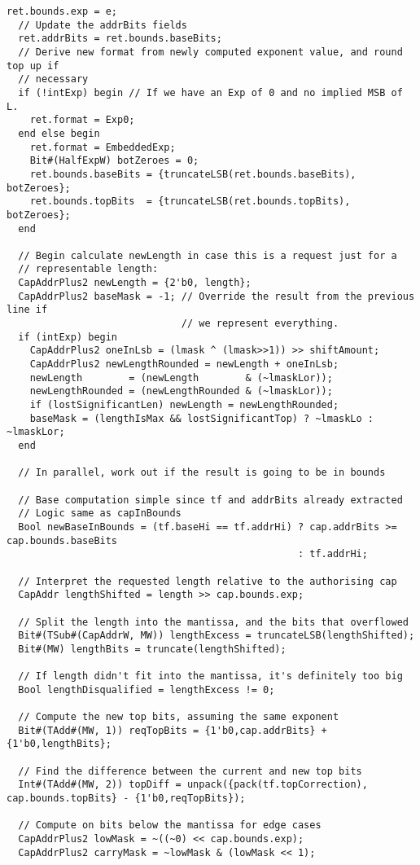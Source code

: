 \begin{lstlisting}[language=bluespec]
  ret.bounds.exp = e;
  // Update the addrBits fields
  ret.addrBits = ret.bounds.baseBits;
  // Derive new format from newly computed exponent value, and round top up if
  // necessary
  if (!intExp) begin // If we have an Exp of 0 and no implied MSB of L.
    ret.format = Exp0;
  end else begin
    ret.format = EmbeddedExp;
    Bit#(HalfExpW) botZeroes = 0;
    ret.bounds.baseBits = {truncateLSB(ret.bounds.baseBits), botZeroes};
    ret.bounds.topBits  = {truncateLSB(ret.bounds.topBits),  botZeroes};
  end

  // Begin calculate newLength in case this is a request just for a
  // representable length:
  CapAddrPlus2 newLength = {2'b0, length};
  CapAddrPlus2 baseMask = -1; // Override the result from the previous line if
                              // we represent everything.
  if (intExp) begin
    CapAddrPlus2 oneInLsb = (lmask ^ (lmask>>1)) >> shiftAmount;
    CapAddrPlus2 newLengthRounded = newLength + oneInLsb;
    newLength        = (newLength        & (~lmaskLor));
    newLengthRounded = (newLengthRounded & (~lmaskLor));
    if (lostSignificantLen) newLength = newLengthRounded;
    baseMask = (lengthIsMax && lostSignificantTop) ? ~lmaskLo : ~lmaskLor;
  end

  // In parallel, work out if the result is going to be in bounds

  // Base computation simple since tf and addrBits already extracted
  // Logic same as capInBounds
  Bool newBaseInBounds = (tf.baseHi == tf.addrHi) ? cap.addrBits >= cap.bounds.baseBits
                                                  : tf.addrHi;

  // Interpret the requested length relative to the authorising cap
  CapAddr lengthShifted = length >> cap.bounds.exp;

  // Split the length into the mantissa, and the bits that overflowed
  Bit#(TSub#(CapAddrW, MW)) lengthExcess = truncateLSB(lengthShifted);
  Bit#(MW) lengthBits = truncate(lengthShifted);

  // If length didn't fit into the mantissa, it's definitely too big
  Bool lengthDisqualified = lengthExcess != 0;

  // Compute the new top bits, assuming the same exponent
  Bit#(TAdd#(MW, 1)) reqTopBits = {1'b0,cap.addrBits} + {1'b0,lengthBits};

  // Find the difference between the current and new top bits
  Int#(TAdd#(MW, 2)) topDiff = unpack({pack(tf.topCorrection), cap.bounds.topBits} - {1'b0,reqTopBits});

  // Compute on bits below the mantissa for edge cases
  CapAddrPlus2 lowMask = ~((~0) << cap.bounds.exp);
  CapAddrPlus2 carryMask = ~lowMask & (lowMask << 1);


\end{lstlisting}
